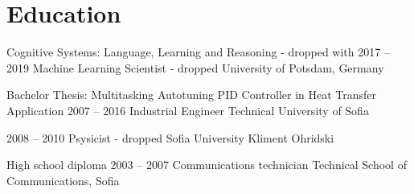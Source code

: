 \documentclass{tccv}
\begin{document}
\section{Education}
\begin{yearlist}
\item[{\footnotesize Cognitive Systems: Language, Learning and Reasoning - dropped with }]
     {2017 -- 2019}
     {Machine Learning Scientist - dropped}
     {University of Potsdam, Germany}

\item[Bachelor Thesis:                 \newline
     {\footnotesize Multitasking Autotuning PID Controller in Heat Transfer Application}]
     {2007 -- 2016}
     {Industrial Engineer}
     {Technical University of Sofia}

\item[]
     {2008 -- 2010}
     {Psysicist - dropped}
     {Sofia University Kliment Ohridski}

\item[High school diploma]{2003 -- 2007}
     {Communications technician}
     {Technical School of Communications, Sofia}
\end{yearlist}


\newpage
\end{document}
